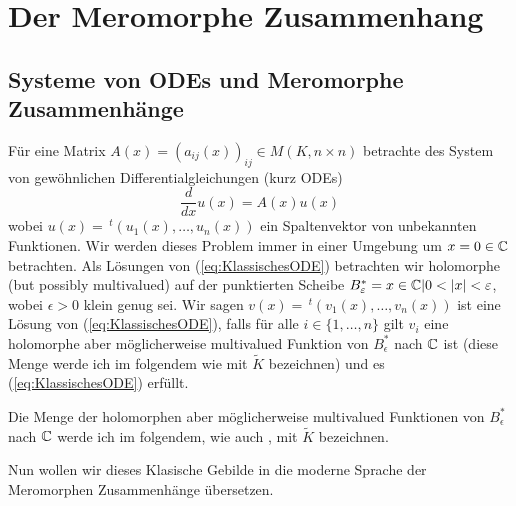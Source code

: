 
\chapter{Der Meromorphe Zusammenhang}
\section{Systeme von ODEs und Meromorphe Zusammenhänge}
\cite[Chap 5.1.1]{hotta2007d} %
Für eine Matrix $A(x)=(a_{ij}(x))_{ij}\in M(K,n\times n)$ betrachte des System
von gewöhnlichen Differentialgleichungen (kurz ODEs)
\begin{equation}
\label{eq:KlassischesODE}
\frac{d}{dx}u(x)=A(x)u(x)
\end{equation}
wobei $u(x)=\,^t(u_1(x),\dots,u_n(x))$ ein Spaltenvektor von unbekannten
Funktionen.  Wir werden dieses Problem immer in einer Umgebung um $x=0\in\mathbb{C}$
betrachten.  Als Lösungen von (\ref{eq:KlassischesODE}) betrachten wir
holomorphe (but possibly multivalued) %
auf der punktierten Scheibe $B_\epsilon^*={x\in\C|0<|x|<\epsilon}$, wobei
$\epsilon>0$ klein genug sei. Wir sagen $v(x)=\,^t(v_1(x),\dots,v_n(x))$ ist
eine Lösung von (\ref{eq:KlassischesODE}), falls für alle $i\in\{1,\dots,n\}$
gilt $ v_i$ eine holomorphe aber möglicherweise
multivalued %
Funktion von $B_\epsilon^*$ nach $\mathbb{C}$ ist (diese Menge werde ich im folgendem
wie \cite{hotta2007d} mit $\tilde K$
bezeichnen) und es (\ref{eq:KlassischesODE})
erfüllt.
\begin{bem}
Die Menge der holomorphen aber möglicherweise 
multivalued %
Funktionen von $B_\epsilon^*$ nach $\mathbb{C}$ werde ich im folgendem, wie auch
\cite{hotta2007d}, mit $\tilde K$ bezeichnen.
\end{bem}

Nun wollen wir dieses Klasische Gebilde in die moderne Sprache der Meromorphen
Zusammenhänge übersetzen.

